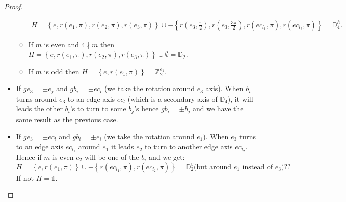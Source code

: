 \documentclass[11pt,a4paper]{amsart}
\theoremstyle{definition}
\newcommand{\ZZ}{\mathbb{Z}}                %
\newcommand{\DD}{\mathbb{D}}                %
\newcommand{\1}{\mathds{1}}		            %
\newcommand{\set}[1]{\left\{#1\right\}}     %
\begin{document}
\begin{proof}
\begin{itemize}
\begin{itemize}
	\begin{align*}
	H=\set{e,r(e_1,\pi),r(e_2,\pi),r(e_3,\pi)}\cup -\set{r(e_3,\frac{\pi}{2}),r(e_3,\frac{3\pi}{2}),r(ec_{l_1},\pi),r(ec_{l_2},\pi)}=\DD_4^h.
	\end{align*}
	\item If $m$ is even and $4\nmid m$ then $H=\set{e,r(e_1,\pi),r(e_2,\pi),r(e_3,\pi)}\cup \emptyset=\DD_2$.
	\item If $m$ is odd then $H=\set{e,r(e_1,\pi)}=\ZZ_2^{e_1}$.
		\end{itemize}
		\item If $ge_3=\pm e_j$ and $gb_i=\pm ec_l$ (we take the rotation around $e_3$ axis). When $b_i$ turns around $e_3$ to an edge axis $ec_l$ (which is a secondary axis of $\DD_4$), it will leads the other $b_i$'s to turn to some $b_j$'s hence $gb_i=\pm b_j$ and we have the same result as the previous case.
        \item If $ge_3=\pm ec_l$ and $gb_i=\pm e_i$ (we take the rotation around $e_1$). When $e_3$ turns to an edge axis $ec_{l_1}$ around $e_1$ it leads $e_2$ to turn to another edge axis $ec_{l_2}$. Hence if $m$ is even $e_2$ will be one of the $b_i$ and we get:
            \begin{equation*}
            H=\set{e,r(e_1,\pi)}\cup -\set{r(ec_{l_1},\pi),r(ec_{l_2},\pi)}=\DD_2^v \text{(but around }e_1 \text{ instead of }e_3)??
            \end{equation*}
            If not $H=\1$.
	\end{itemize}
\end{proof}
\end{document}
